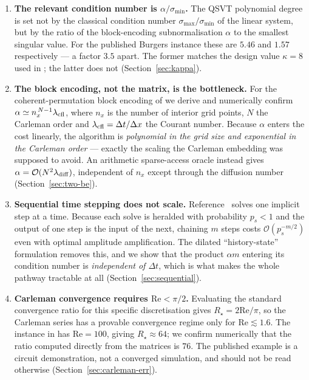 \documentclass[11pt,a4paper]{article}
\theoremstyle{plain}
\theoremstyle{definition}
\theoremstyle{remark}
\newcommand{\Rey}{\mathrm{Re}}
\newcommand{\Oh}{\mathcal{O}}
\begin{document}
\begin{enumerate}[leftmargin=*]

\item \textbf{The relevant condition number is $\alpha/\sigma_{\min}$.}
The QSVT polynomial degree is set not by the classical condition number
$\sigma_{\max}/\sigma_{\min}$ of the linear system, but by the ratio of the
block-encoding subnormalisation $\alpha$ to the smallest singular value.  For
the published Burgers instance these are $5.46$ and $1.57$ respectively --- a
factor $3.5$ apart.  The former matches the design value $\kappa=8$ used in
\cite{Setty2026}; the latter does not (Section~\ref{sec:kappa}).

\item \textbf{The block encoding, not the matrix, is the bottleneck.}
For the coherent-permutation block encoding of \cite{Setty2026,Setty2025BE} we
derive and numerically confirm
$\alpha \simeq n_x^{\,N-1}\lambda_{\rm cfl}$,
where $n_x$ is the number of interior grid points, $N$ the Carleman order and
$\lambda_{\rm cfl}=\Delta t/\Delta x$ the Courant number.  Because $\alpha$
enters the cost linearly, the algorithm is \emph{polynomial in the grid size and
exponential in the Carleman order} --- exactly the scaling the Carleman
embedding was supposed to avoid.  An arithmetic sparse-access oracle instead
gives $\alpha=\Oh(N^2\lambda_{\rm diff})$, independent of $n_x$ except through
the diffusion number (Section~\ref{sec:two-be}).

\item \textbf{Sequential time stepping does not scale.}
Reference~\cite{Setty2026} solves one implicit step at a time.  Because each
solve is heralded with probability $p_s<1$ and the output of one step is the
input of the next, chaining $m$ steps costs $\Oh(p_s^{-m/2})$ even with optimal
amplitude amplification.  The dilated ``history-state'' formulation removes
this, and we show that the product $\alpha m$ entering its condition number is
\emph{independent of $\Delta t$}, which is what makes the whole pathway
tractable at all (Section~\ref{sec:sequential}).

\item \textbf{Carleman convergence requires $\Rey<\pi/2$.}
Evaluating the standard convergence ratio for this specific discretisation gives
$R_\star = 2\Rey/\pi$, so the Carleman series has a provable convergence regime
only for $\Rey\lesssim1.6$.  The instance in \cite{Setty2026} has $\Rey=100$,
giving $R_\star\approx64$; we confirm numerically that the ratio computed
directly from the matrices is $76$.  The published example is a circuit
demonstration, not a converged simulation, and should not be read otherwise
(Section~\ref{sec:carleman-err}).


\end{enumerate}
\end{document}
